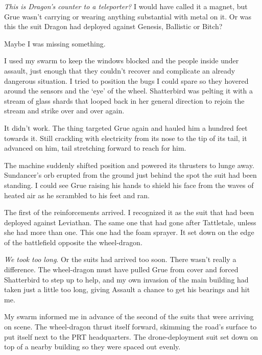 \emph{This is Dragon's counter to a teleporter?}  I would have called it a magnet, but Grue wasn't carrying or wearing anything substantial with metal on it.  Or was this the suit Dragon had deployed against Genesis, Ballistic or Bitch?



Maybe I was missing something.



I used my swarm to keep the windows blocked and the people inside under assault, just enough that they couldn't recover and complicate an already dangerous situation.  I tried to position the bugs I could spare so they hovered around the sensors and the `eye' of the wheel.  Shatterbird was pelting it with a stream of glass shards that looped back in her general direction to rejoin the stream and strike over and over again.



It didn't work.  The thing targeted Grue again and hauled him a hundred feet towards it.  Still crackling with electricity from its nose to the tip of its tail, it advanced on him, tail stretching forward to reach for him.



The machine suddenly shifted position and powered its thrusters to lunge away.  Sundancer's orb erupted from the ground just behind the spot the suit had been standing.  I could see Grue raising his hands to shield his face from the waves of heated air as he scrambled to his feet and ran.



The first of the reinforcements arrived.  I recognized it as the suit that had been deployed against Leviathan.  The same one that had gone after Tattletale, unless she had more than one.  This one had the foam sprayer.  It set down on the edge of the battlefield opposite the wheel-dragon.



\emph{We took too long}.  Or the suits had arrived too soon.  There wasn't really a difference.  The wheel-dragon must have pulled Grue from cover and forced Shatterbird to step up to help, and my own invasion of the main building had taken just a little too long, giving Assault a chance to get his bearings and hit me.



My swarm informed me in advance of the second of the suits that were arriving on scene.  The wheel-dragon thrust itself forward, skimming the road's surface to put itself next to the PRT headquarters.  The drone-deployment suit set down on top of a nearby building so they were spaced out evenly.



